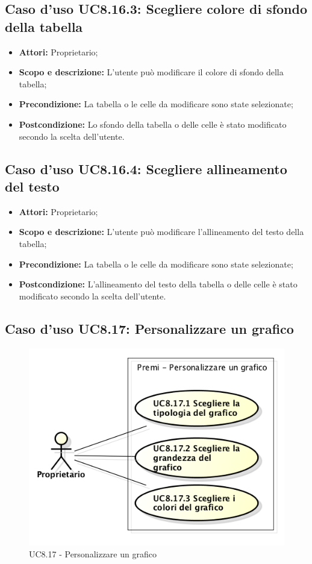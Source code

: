 \subsection{Caso d'uso UC8.16.3: Scegliere colore di sfondo della tabella}
\begin{itemize}
	\item \textbf{Attori:} Proprietario;
	\item \textbf{Scopo e descrizione:} L'utente può modificare il colore di sfondo della tabella;
	\item \textbf{Precondizione:} La tabella o le celle da modificare sono state selezionate;
	\item \textbf{Postcondizione:} Lo sfondo della tabella o delle celle è stato modificato secondo la scelta dell'utente.
\end{itemize}

\subsection{Caso d'uso UC8.16.4: Scegliere allineamento del testo}
\begin{itemize}
	\item \textbf{Attori:} Proprietario;
	\item \textbf{Scopo e descrizione:} L'utente può modificare l'allineamento del testo della tabella;
	\item \textbf{Precondizione:} La tabella o le celle da modificare sono state selezionate;
	\item \textbf{Postcondizione:} L'allineamento del testo della tabella o delle celle è stato modificato secondo la scelta dell'utente.
\end{itemize}


\subsection{Caso d'uso UC8.17: Personalizzare un grafico}
\begin{figure}[h] 
	\centering 
	\includegraphics[scale=0.45] {img/UC8.17.png} 
	\caption{UC8.17 - Personalizzare un grafico} 
\end{figure}

